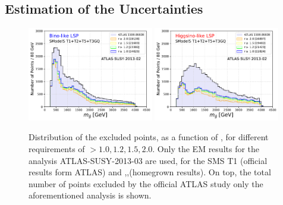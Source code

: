 \documentclass[epj,nopacs,fleqn]{svjour}
\begin{document}
\subsection{Estimation of the Uncertainties}\label{estimation}
\begin{figure}[!h]
	\begin{center}
		\subfigure
		{\includegraphics[width=0.49\textwidth]{PLOTS/Combination/Bino_TOT_GLU_Histo_rValue.pdf}}
		\subfigure
		{\includegraphics[width=0.49\textwidth]{PLOTS/Combination/Higgsino_TOT_GLU_Histo_rValue.pdf}}
	\end{center}
	\caption{Distribution of the excluded points, as a function of \MGLU, for different requirements of \RVALUE$>1.0,1.2,1.5,2.0$. Only the EM results for the analysis ATLAS-SUSY-2013-03 are used, for the SMS T1 (official results form ATLAS) and \Ttwo,\Tfive,\TGQ (homegrown \SMO results). On top, the total number of points excluded by the official ATLAS study only the aforementioned analysis is shown. } 
	\label{unc}
\end{figure}
\end{document}
